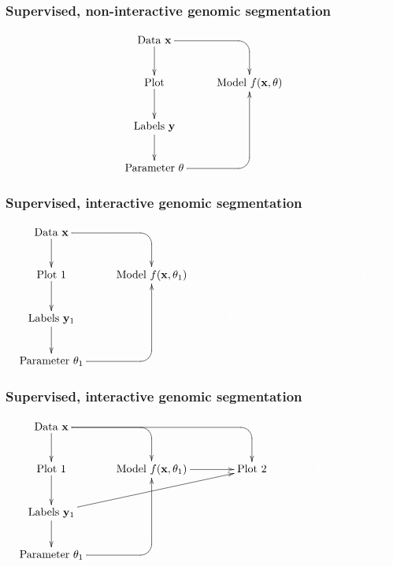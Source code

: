 \documentclass{beamer}
\begin{document}
\begin{frame}
  \frametitle{Supervised, non-interactive genomic segmentation}
  \begin{displaymath}
  \xymatrix{
    \text{Data $\mathbf x$}
    \ar `[r] [dr] 
    \ar [d]
    & \text{ }
    \\
    \text{Plot} 
    \ar [d]
    & 
    \text{Model $f(\mathbf x, \theta)$} 
    \\
    \text{Labels $\mathbf y$}       
    \ar [d]
    \\
    \text{Parameter $\theta$} 
    \ar `r[ruu] [ruu]
    & \text{ }
  }
  \end{displaymath}
\end{frame}

\begin{frame}
  \frametitle{Supervised, interactive genomic segmentation}
  \small
  \begin{displaymath}
  \xymatrix{
    \text{Data $\mathbf x$}
    \ar `[r] [dr] 
    \ar [d]
    & \text{ }
    & \text{ }
    & \text{ }
    \\
    \text{Plot 1} 
    \ar [d]
    & 
    \text{Model $f(\mathbf x, \theta_1)$} 
    &
    \color{white}{\text{Plot 2} }
    & 
    \color{white}{\text{Model $f(\mathbf x, \theta_2)$} }
    \\
    \text{Labels $\mathbf y_1$}       
    \ar [d]
    &
    &
    \color{white}{\text{Labels $\mathbf y_2$}}
    \\
    \text{Parameter $\theta_1$} 
    \ar `r[ruu] [ruu]
    & \text{ }
    & 
    \color{white}{\text{Parameter $\theta_2$}}
  }
  \end{displaymath}
\end{frame}

\begin{frame}
  \frametitle{Supervised, interactive genomic segmentation}
  \small
  \begin{displaymath}
  \xymatrix{
    \text{Data $\mathbf x$}
    \ar `[r] [dr] 
    \ar `r[rr] [drr] 
    \ar [d]
    & \text{ }
    & \text{ }
    & \text{ }
    \\
    \text{Plot 1} 
    \ar [d]
    & 
    \text{Model $f(\mathbf x, \theta_1)$} 
    \ar [r]
    &
    \text{Plot 2} 
    & 
    \color{white}{\text{Model $f(\mathbf x, \theta_2)$} }
    \\
    \text{Labels $\mathbf y_1$}       
    \ar [d]
    \ar [rru]
    &
    &
    \color{white}{\text{Labels $\mathbf y_2$}}
    \\
    \text{Parameter $\theta_1$} 
    \ar `r[ruu] [ruu]
    & \text{ }
    & 
    \color{white}{\text{Parameter $\theta_2$}}
  }
  \end{displaymath}
\end{frame}
\end{document}
